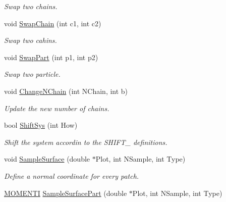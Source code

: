 \begin{DoxyCompactItemize}
\begin{DoxyCompactList}\small\item\em Swap two chains. \end{DoxyCompactList}\item 
void \hyperlink{classVarData_a99c4147680f33ecf84c4cd007eaf6484}{Swap\+Chain} (int c1, int c2)\hypertarget{classVarData_a99c4147680f33ecf84c4cd007eaf6484}{}\label{classVarData_a99c4147680f33ecf84c4cd007eaf6484}

\begin{DoxyCompactList}\small\item\em Swap two cahins. \end{DoxyCompactList}\item 
void \hyperlink{classVarData_a8ba9acea35fd51296eda97612a51cff1}{Swap\+Part} (int p1, int p2)\hypertarget{classVarData_a8ba9acea35fd51296eda97612a51cff1}{}\label{classVarData_a8ba9acea35fd51296eda97612a51cff1}

\begin{DoxyCompactList}\small\item\em Swap two particle. \end{DoxyCompactList}\item 
void \hyperlink{classVarData_a91c4722a7eea67c5d5ddefedf07b9ba4}{Change\+N\+Chain} (int N\+Chain, int b)\hypertarget{classVarData_a91c4722a7eea67c5d5ddefedf07b9ba4}{}\label{classVarData_a91c4722a7eea67c5d5ddefedf07b9ba4}

\begin{DoxyCompactList}\small\item\em Update the new number of chains. \end{DoxyCompactList}\item 
bool \hyperlink{classVarData_abc02299ea6cc594c4a1a31862ded3019}{Shift\+Sys} (int How)\hypertarget{classVarData_abc02299ea6cc594c4a1a31862ded3019}{}\label{classVarData_abc02299ea6cc594c4a1a31862ded3019}

\begin{DoxyCompactList}\small\item\em Shift the system accordin to the S\+H\+I\+F\+T\+\_\+ definitions. \end{DoxyCompactList}\item 
void \hyperlink{classVarData_aba8419a8fffac92d2f0855c9507dda75}{Sample\+Surface} (double $\ast$Plot, int N\+Sample, int Type)\hypertarget{classVarData_aba8419a8fffac92d2f0855c9507dda75}{}\label{classVarData_aba8419a8fffac92d2f0855c9507dda75}

\begin{DoxyCompactList}\small\item\em Define a normal coordinate for every patch. \end{DoxyCompactList}\item 
\hyperlink{structMOMENTI}{M\+O\+M\+E\+N\+TI} \hyperlink{classVarData_a9e9c6efa2057436c2d691a584f1cbdeb}{Sample\+Surface\+Part} (double $\ast$Plot, int N\+Sample, int Type)\hypertarget{classVarData_a9e9c6efa2057436c2d691a584f1cbdeb}{}\label{classVarData_a9e9c6efa2057436c2d691a584f1cbdeb}


\end{DoxyCompactItemize}
